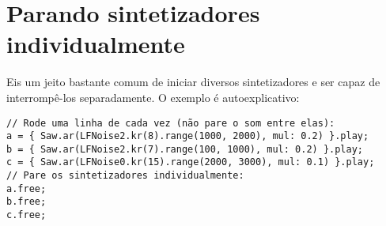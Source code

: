 \section{Parando sintetizadores individualmente}

Eis um jeito bastante comum de iniciar diversos sintetizadores e ser capaz de interrompê-los separadamente. O exemplo é autoexplicativo:

\begin{lstlisting}[style=SuperCollider-IDE, basicstyle=\scttfamily\footnotesize]
// Rode uma linha de cada vez (não pare o som entre elas):
a = { Saw.ar(LFNoise2.kr(8).range(1000, 2000), mul: 0.2) }.play;
b = { Saw.ar(LFNoise2.kr(7).range(100, 1000), mul: 0.2) }.play;
c = { Saw.ar(LFNoise0.kr(15).range(2000, 3000), mul: 0.1) }.play;
// Pare os sintetizadores individualmente:
a.free;
b.free;
c.free; 	
\end{lstlisting}
